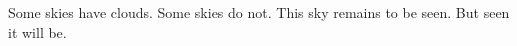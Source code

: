 

Some skies have clouds.  Some skies do not.  This sky remains to be seen.  But seen it will be.

\bye
